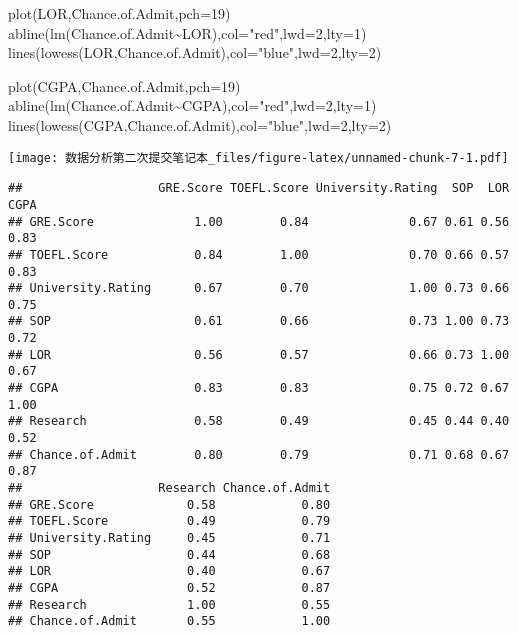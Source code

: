\documentclass[
]{article}
\newenvironment{Shaded}{\begin{snugshade}}{\end{snugshade}}
\newcommand{\AttributeTok}[1]{\textcolor[rgb]{0.77,0.63,0.00}{#1}}
\newcommand{\DecValTok}[1]{\textcolor[rgb]{0.00,0.00,0.81}{#1}}
\newcommand{\FunctionTok}[1]{\textcolor[rgb]{0.00,0.00,0.00}{#1}}
\newcommand{\NormalTok}[1]{#1}
\newcommand{\OtherTok}[1]{\textcolor[rgb]{0.56,0.35,0.01}{#1}}
\newcommand{\SpecialCharTok}[1]{\textcolor[rgb]{0.00,0.00,0.00}{#1}}
\newcommand{\StringTok}[1]{\textcolor[rgb]{0.31,0.60,0.02}{#1}}
\begin{document}
\begin{Shaded}
\begin{Highlighting}[]
\FunctionTok{plot}\NormalTok{(LOR,Chance.of.Admit,}\AttributeTok{pch=}\DecValTok{19}\NormalTok{)}
\FunctionTok{abline}\NormalTok{(}\FunctionTok{lm}\NormalTok{(Chance.of.Admit}\SpecialCharTok{\textasciitilde{}}\NormalTok{LOR),}\AttributeTok{col=}\StringTok{"red"}\NormalTok{,}\AttributeTok{lwd=}\DecValTok{2}\NormalTok{,}\AttributeTok{lty=}\DecValTok{1}\NormalTok{)}
\FunctionTok{lines}\NormalTok{(}\FunctionTok{lowess}\NormalTok{(LOR,Chance.of.Admit),}\AttributeTok{col=}\StringTok{"blue"}\NormalTok{,}\AttributeTok{lwd=}\DecValTok{2}\NormalTok{,}\AttributeTok{lty=}\DecValTok{2}\NormalTok{)}

\FunctionTok{plot}\NormalTok{(CGPA,Chance.of.Admit,}\AttributeTok{pch=}\DecValTok{19}\NormalTok{)}
\FunctionTok{abline}\NormalTok{(}\FunctionTok{lm}\NormalTok{(Chance.of.Admit}\SpecialCharTok{\textasciitilde{}}\NormalTok{CGPA),}\AttributeTok{col=}\StringTok{"red"}\NormalTok{,}\AttributeTok{lwd=}\DecValTok{2}\NormalTok{,}\AttributeTok{lty=}\DecValTok{1}\NormalTok{)}
\FunctionTok{lines}\NormalTok{(}\FunctionTok{lowess}\NormalTok{(CGPA,Chance.of.Admit),}\AttributeTok{col=}\StringTok{"blue"}\NormalTok{,}\AttributeTok{lwd=}\DecValTok{2}\NormalTok{,}\AttributeTok{lty=}\DecValTok{2}\NormalTok{)}
\end{Highlighting}
\end{Shaded}

\texttt{[image: 数据分析第二次提交笔记本\_files/figure-latex/unnamed-chunk-7-1.pdf]}

\begin{Shaded}
\end{Shaded}

\begin{verbatim}
##                   GRE.Score TOEFL.Score University.Rating  SOP  LOR CGPA
## GRE.Score              1.00        0.84              0.67 0.61 0.56 0.83
## TOEFL.Score            0.84        1.00              0.70 0.66 0.57 0.83
## University.Rating      0.67        0.70              1.00 0.73 0.66 0.75
## SOP                    0.61        0.66              0.73 1.00 0.73 0.72
## LOR                    0.56        0.57              0.66 0.73 1.00 0.67
## CGPA                   0.83        0.83              0.75 0.72 0.67 1.00
## Research               0.58        0.49              0.45 0.44 0.40 0.52
## Chance.of.Admit        0.80        0.79              0.71 0.68 0.67 0.87
##                   Research Chance.of.Admit
## GRE.Score             0.58            0.80
## TOEFL.Score           0.49            0.79
## University.Rating     0.45            0.71
## SOP                   0.44            0.68
## LOR                   0.40            0.67
## CGPA                  0.52            0.87
## Research              1.00            0.55
## Chance.of.Admit       0.55            1.00
\end{verbatim}
\end{document}
